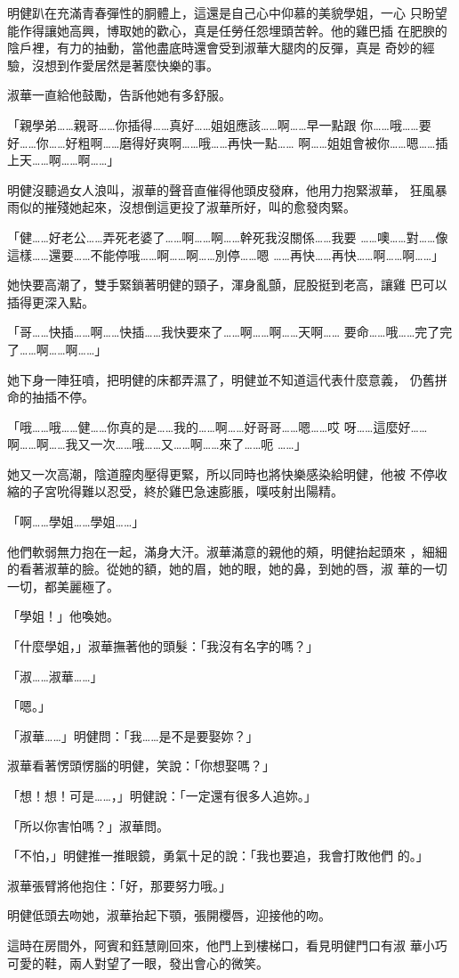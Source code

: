 明健趴在充滿青春彈性的胴體上，這還是自己心中仰慕的美貌學姐，一心
只盼望能作得讓她高興，博取她的歡心，真是任勞任怨埋頭苦幹。他的雞巴插
在肥腴的陰戶裡，有力的抽動，當他盡底時還會受到淑華大腿肉的反彈，真是
奇妙的經驗，沒想到作愛居然是著麼快樂的事。

淑華一直給他鼓勵，告訴他她有多舒服。

「親學弟……親哥……你插得……真好……姐姐應該……啊……早一點跟
你……哦……要好……你……好粗啊……磨得好爽啊……哦……再快一點……
啊……姐姐會被你……嗯……插上天……啊……啊……」

明健沒聽過女人浪叫，淑華的聲音直催得他頭皮發麻，他用力抱緊淑華，
狂風暴雨似的摧殘她起來，沒想倒這更投了淑華所好，叫的愈發肉緊。

「健……好老公……弄死老婆了……啊……啊……幹死我沒關係……我要
……噢……對……像這樣……還要……不能停哦……啊……啊……別停……嗯
……再快……再快……啊……啊……」

她快要高潮了，雙手緊鎖著明健的頸子，渾身亂顫，屁股挺到老高，讓雞
巴可以插得更深入點。

「哥……快插……啊……快插……我快要來了……啊……啊……天啊……
要命……哦……完了完了……啊……啊……」

她下身一陣狂噴，把明健的床都弄濕了，明健並不知道這代表什麼意義，
仍舊拼命的抽插不停。

「哦……哦……健……你真的是……我的……啊……好哥哥……嗯……哎
呀……這麼好……啊……啊……我又一次……哦……又……啊……來了……呃
……」

她又一次高潮，陰道膣肉壓得更緊，所以同時也將快樂感染給明健，他被
不停收縮的子宮吮得難以忍受，終於雞巴急速膨脹，噗吱射出陽精。

「啊……學姐……學姐……」

他們軟弱無力抱在一起，滿身大汗。淑華滿意的親他的頰，明健抬起頭來
，細細的看著淑華的臉。從她的額，她的眉，她的眼，她的鼻，到她的唇，淑
華的一切一切，都美麗極了。

「學姐！」他喚她。

「什麼學姐，」淑華撫著他的頭髮：「我沒有名字的嗎？」

「淑……淑華……」

「嗯。」

「淑華……」明健問：「我……是不是要娶妳？」

淑華看著愣頭愣腦的明健，笑說：「你想娶嗎？」

「想！想！可是……，」明健說：「一定還有很多人追妳。」

「所以你害怕嗎？」淑華問。

「不怕，」明健推一推眼鏡，勇氣十足的說：「我也要追，我會打敗他們
的。」

淑華張臂將他抱住：「好，那要努力哦。」

明健低頭去吻她，淑華抬起下顎，張開櫻唇，迎接他的吻。

這時在房間外，阿賓和鈺慧剛回來，他門上到樓梯口，看見明健門口有淑
華小巧可愛的鞋，兩人對望了一眼，發出會心的微笑。










